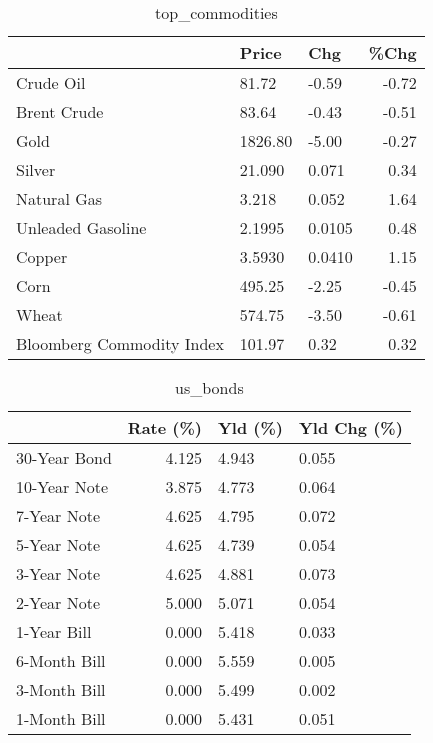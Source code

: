 \documentclass{article}%
\begin{document}
\begin{table}[htbp]%
\caption{top\_commodities}%
\centering%
\begin{adjustbox}{width=1\textwidth}%
\begin{tabular}{lllr}
\toprule
                          &   Price &    Chg &  \%Chg \\
\midrule
               Crude Oil  &   81.72 &  -0.59 & -0.72 \\
             Brent Crude  &   83.64 &  -0.43 & -0.51 \\
                    Gold  & 1826.80 &  -5.00 & -0.27 \\
                  Silver  &  21.090 &  0.071 &  0.34 \\
             Natural Gas  &   3.218 &  0.052 &  1.64 \\
       Unleaded Gasoline  &  2.1995 & 0.0105 &  0.48 \\
                  Copper  &  3.5930 & 0.0410 &  1.15 \\
                    Corn  &  495.25 &  -2.25 & -0.45 \\
                   Wheat  &  574.75 &  -3.50 & -0.61 \\
Bloomberg Commodity Index &  101.97 &   0.32 &  0.32 \\
\bottomrule
\end{tabular}
%
\end{adjustbox}%
\end{table}

%


\begin{table}[htbp]%
\caption{us\_bonds}%
\centering%
\begin{adjustbox}{width=1\textwidth}%
\begin{tabular}{lrll}
\toprule
             &  Rate (\%) & Yld (\%) & Yld Chg (\%) \\
\midrule
30-Year Bond &     4.125 &   4.943 &       0.055 \\
10-Year Note &     3.875 &   4.773 &       0.064 \\
 7-Year Note &     4.625 &   4.795 &       0.072 \\
 5-Year Note &     4.625 &   4.739 &       0.054 \\
 3-Year Note &     4.625 &   4.881 &       0.073 \\
 2-Year Note &     5.000 &   5.071 &       0.054 \\
 1-Year Bill &     0.000 &   5.418 &       0.033 \\
6-Month Bill &     0.000 &   5.559 &       0.005 \\
3-Month Bill &     0.000 &   5.499 &       0.002 \\
1-Month Bill &     0.000 &   5.431 &       0.051 \\
\bottomrule
\end{tabular}
%
\end{adjustbox}%
\end{table}
\end{document}
